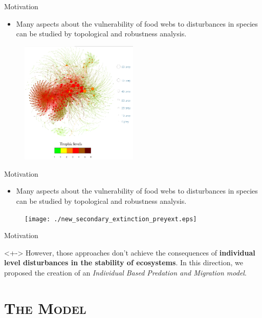 \documentclass[xcolor=x11names,compress]{beamer}
\renewcommand{\(}{\begin{columns}}
\renewcommand{\)}{\end{columns}}
\newcommand{\<}[1]{\begin{column}{#1}}
\renewcommand{\>}{\end{column}}
\begin{document}
\begin{frame}{Motivation}
\begin{itemize}
\item Many aspects about the vulnerability of food webs to disturbances in species can be studied by topological and robustness analysis.
\end{itemize}
\begin{figure}
\includegraphics[width=0.5\textwidth]{./Antarctic_fweb_review_hires.eps}
\end{figure}
\end{frame}

\begin{frame}{Motivation}
\begin{itemize}
\item Many aspects about the vulnerability of food webs to disturbances in species can be studied by topological and robustness analysis.
\end{itemize}
\begin{figure}
\texttt{[image: ./new\_secondary\_extinction\_preyext.eps]}
\end{figure}
\end{frame}



\begin{frame}{Motivation}
\begin{block}<+->{}
However, those approaches don't achieve the consequences of \textbf{individual level disturbances in the stability of ecosystems}. In this direction, we proposed the creation of an \emph{Individual Based Predation and Migration model}.
\end{block} 
\end{frame}

\section{\scshape The Model}
\end{document}
